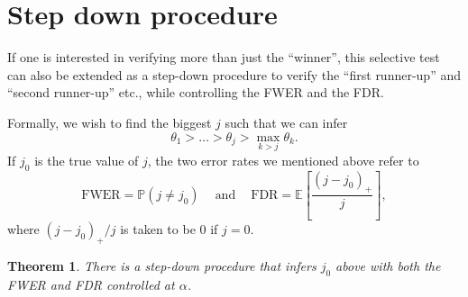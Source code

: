 \documentclass[11pt]{article}
\newtheorem{theorem}{Theorem}
\newcommand{\EE}{\mathbb{E}}
\newcommand{\PP}{\mathbb{P}}
\begin{document}
\section{Step down procedure}
\label{sec:step_down_procedure}

If one is interested in verifying more than just the ``winner'', this selective test can also be extended as a step-down procedure to verify the ``first runner-up'' and ``second runner-up'' etc., while controlling the FWER and the FDR.

Formally, we wish to find the biggest $j$ such that we can infer
$$\theta_1 > \ldots > \theta_j > \max_{k>j} \theta_k.$$
If $j_0$ is the true value of $j$, the two error rates we mentioned above refer to
$$\text{FWER} = \PP\left(j \ne j_0\right) ~~~~ \text{ and } ~~~~ \text{FDR} = \EE\left[\frac{\left(j - j_0\right)_+}{j}\right],$$
where $\left(j - j_0\right)_+ / j$ is taken to be $0$ if $j = 0$.

\begin{theorem}
There is a step-down procedure that infers $j_0$ above with both the FWER and FDR controlled at $\alpha$.
\end{theorem}
\end{document}
